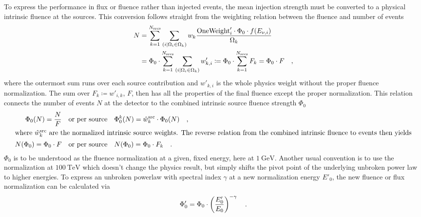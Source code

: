 To express the performance in flux or fluence rather than injected events, the mean injection strength must be converted to a physical intrinsic fluence at the sources.
This conversion follows straight from the weighting relation between the fluence and number of events
\begin{align}
  \label{equ:raw_flux}
  N &= \sum_{k=1}^{N_\text{srcs}} \sum_{(i|\Omega_i \in \Omega_k)}
    w_k\frac{\text{OneWeight}'_i\cdot\Phi_0\cdot f(E_{\nu,i})}{\Omega_k} \\
  &= \Phi_0 \cdot
      \sum_{k=1}^{N_\text{srcs}}
      \sum_{(i|\Omega_i \in \Omega_k)} w'_{k,i}
  \coloneqq \Phi_0 \cdot \sum_{k=1}^{N_\text{srcs}} F_k = \Phi_0 \cdot F
  \quad\text{,}
\end{align}
where the outermost sum runs over each source contribution and $w'_{k,i}$ is the whole physics weight without the proper fluence normalization.
The sum over $F_k \coloneqq w'_{i,k}$, $F$, then has all the properties of the final fluence except the proper normalization.
This relation connects the number of events $N$ at the detector to the combined intrinsic source fluence strength $\Phi_0$
\begin{align}
  \label{equ:flux_to_mu}
  \Phi_0(N) = \frac{N}{F}
    &\quad\text{or per source}\quad
    \Phi_0^k(N) = \hat{w}_k^\text{src} \cdot \Phi_0(N)
    \quad\text{,} \\
  \intertext{where $\hat{w}_k^\text{src}$ are the normalized intrinsic source weights. The reverse relation from the combined intrinsic fluence to events then yields}
  N(\Phi_0) = \Phi_0 \cdot F
    &\quad\text{or per source}\quad
    N(\Phi_0) = \Phi_0 \cdot F_k
  \quad\text{.}
\end{align}
$\Phi_0$ is to be understood as the fluence normalization at a given, fixed energy, here at $\SI{1}{\GeV}$.
Another usual convention is to use the normalization at $\SI{100}{\TeV}$ which doesn't change the physics result, but simply shifts the pivot point of the underlying unbroken power law to higher energies.
To express an unbroken powerlaw with spectral index $\gamma$ at a new normalization energy $E'_0$, the new fluence or flux normalization can be calculated via
\begin{equation}
  \Phi'_0 = \Phi_0 \cdot \left(\frac{E'_0}{E_0}\right)^{-\gamma}
  \quad\text{.}
\end{equation}

